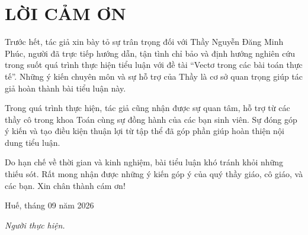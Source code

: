\documentclass[12pt,a4paper,oneside]{book}
\theoremstyle{theorem}
\theoremstyle{definition}
\begin{document}
	
	
	\newpage
	\newpage
	\def\@chapter[#1]#2{\ifnum \c@secnumdepth >\m@ne
		\if@mainmatter
		\refstepcounter{chapter}%
		\typeout{\@chapapp\space\thechapter.}%
		\addcontentsline{toc}{chapter}%
		{\bf  Chương \protect\numberline{\thechapter. } #1}%
		\else
		\addcontentsline{toc}{chapter}{ #1}%
		\fi
		\else
		\addcontentsline{toc}{chapter}{ #1}%
		\fi
		\chaptermark{#1}%
		\addtocontents{lof}{\protect\addvspace{10\p@}}%
		\addtocontents{lot}{\protect\addvspace{10\p@}}%
		\if@twocolumn
		\@topnewpage[\@makechapterhead{#2}]%
		\else
		\@makechapterhead{#2}%
		\@afterheading
		\fi}
	\tableofcontents
	\pagestyle{plain}
	\chapter*{LỜI CẢM ƠN}
	\fontsize{13pt}{22pt} \selectfont
Trước hết, tác giả xin bày tỏ sự trân trọng đối với Thầy Nguyễn Đăng Minh Phúc, người đã trực tiếp hướng dẫn, tận tình chỉ bảo và định hướng nghiên cứu trong suốt quá trình thực hiện tiểu luận với đề tài “Vectơ trong các bài toán thực tế”. Những ý kiến chuyên môn và sự hỗ trợ của Thầy là cơ sở quan trọng giúp tác giả hoàn thành bài tiểu luận này.

Trong quá trình thực hiện, tác giả cũng nhận được sự quan tâm, hỗ trợ từ các thầy cô trong khoa Toán cùng sự đồng hành của các bạn sinh viên. Sự đóng góp ý kiến và tạo điều kiện thuận lợi từ tập thể đã góp phần giúp hoàn thiện nội dung tiểu luận.

Do hạn chế về thời gian và kinh nghiệm, bài tiểu luận khó tránh khỏi những thiếu sót. Rất mong nhận được những ý kiến góp ý của quý thầy giáo, cô giáo, và các bạn. Xin chân thành cám ơn!
	
	\begin{flushright}
		Huế, tháng 09 năm 2026
		
		\textit{Người thực hiện.}
	\end{flushright}
	
	
	
	
\end{document}
